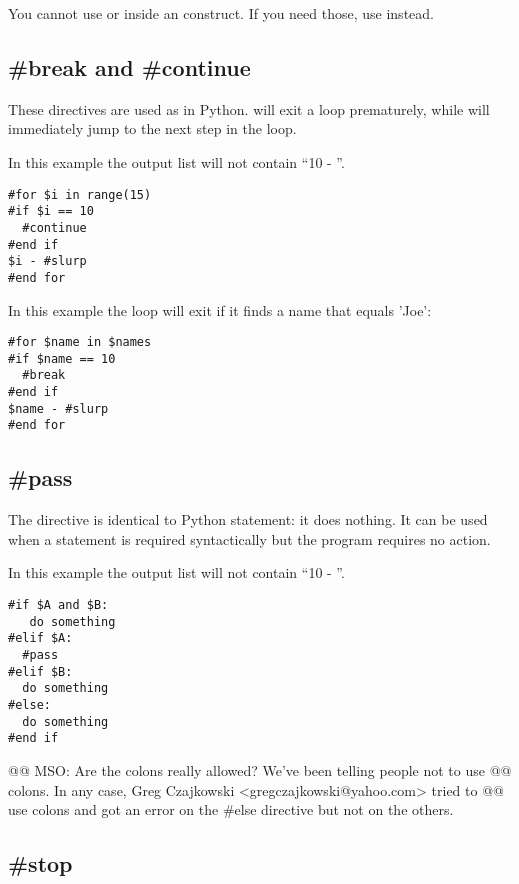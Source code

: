 You cannot use  or  inside an 
construct.  If you need those, use  instead.

\subsection{\#break and \#continue}
\label{flowControl.break}

These directives are used as in Python.  will
exit a  loop prematurely, while  will immediately
jump to the next step in the  loop.

In this example the output list will not contain ``10 - ''. 
\begin{verbatim}
#for $i in range(15)
#if $i == 10
  #continue
#end if
$i - #slurp
#end for
\end{verbatim}

In this example the loop will exit if it finds a name that equals 'Joe':
\begin{verbatim}
#for $name in $names
#if $name == 10
  #break
#end if
$name - #slurp
#end for
\end{verbatim}


\subsection{\#pass}
\label{flowControl.break}

The  directive is identical to Python  statement: it
does nothing. It can be used when a statement is required syntactically but the
program requires no action.

In this example the output list will not contain ``10 - ''. 
\begin{verbatim}
#if $A and $B:
   do something
#elif $A:
  #pass
#elif $B: 
  do something
#else:
  do something
#end if
\end{verbatim}

@@ MSO: Are the colons really allowed?  We've been telling people not to use
@@ colons.  In any case, Greg Czajkowski <gregczajkowski@yahoo.com> tried to
@@ use colons and got an error on the #else directive but not on the others.

\subsection{\#stop}
\label{flowControl.stop}

